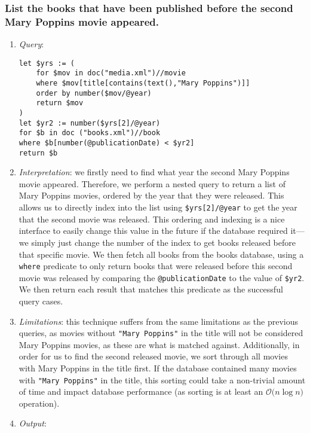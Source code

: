 \documentclass[11pt]{article}
\begin{document}
\subsubsection{List the books that have been published before the second Mary Poppins movie appeared.}

\begin{enumerate}
\item \textit{Query}:
\begin{small}
\begin{verbatim}
let $yrs := (
    for $mov in doc("media.xml")//movie
    where $mov[title[contains(text(),"Mary Poppins")]]
    order by number($mov/@year) 
    return $mov
) 
let $yr2 := number($yrs[2]/@year) 
for $b in doc ("books.xml")//book 
where $b[number(@publicationDate) < $yr2] 
return $b
\end{verbatim}
\end{small}
\item \textit{Interpretation}: we firstly need to find what year the second Mary Poppins movie appeared. Therefore, we perform a nested query to return a list of Mary Poppins movies, ordered by the year that they were released. This allows us to directly index into the list using \texttt{\$yrs[2]/@year} to get the year that the second movie was released. This ordering and indexing is a nice interface to easily change this value in the future if the database required it---we simply just change the number of the index to get books released before that specific movie. We then fetch all books from the books database, using a \texttt{where} predicate to only return books that were released before this second movie was released by comparing the \texttt{@publicationDate} to the value of \texttt{\$yr2}. We then return each result that matches this predicate as the successful query cases.
\item \textit{Limitations}: this technique suffers from the same limitations as the previous queries, as movies without \texttt{"Mary Poppins"} in the title will not be considered Mary Poppins movies, as these are what is matched against. Additionally, in order for us to find the second released movie, we sort through all movies with Mary Poppins in the title first. If the database contained many movies with \texttt{"Mary Poppins"} in the title, this sorting could take a non-trivial amount of time and impact database performance (as sorting is at least an $\mathcal{O}({n\log{n})}$ operation).
\item \textit{Output}:
\begin{verbatim}

\end{verbatim}
\end{enumerate}
\end{document}
